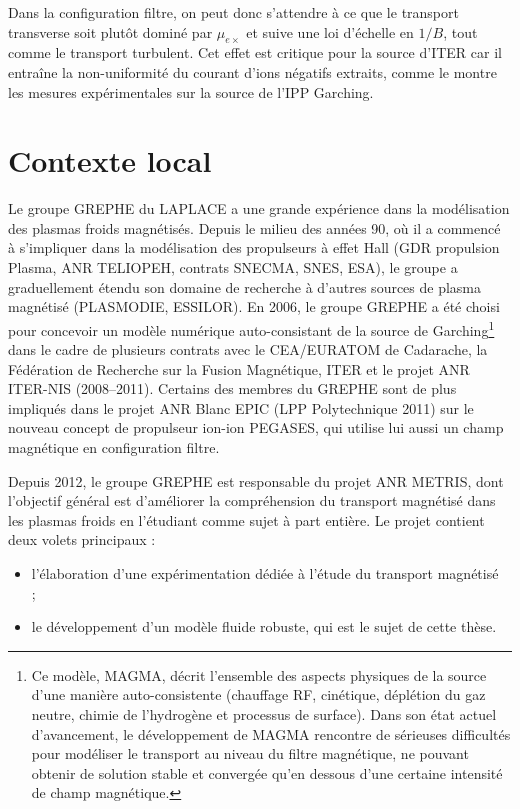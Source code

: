 \begin{refsection}
Dans la configuration filtre, on peut donc s'attendre à ce que le transport
transverse soit plutôt dominé par $\mu_{e\times}$ et suive une loi d'échelle en $1/B$, tout comme le transport
turbulent. Cet effet est critique pour la source d'ITER car il
entraîne la non-uniformité du courant d'ions négatifs extraits, comme le montre
les mesures expérimentales sur la source de l'IPP Garching.

 \section*{Contexte local} Le
groupe GREPHE du LAPLACE a une grande expérience dans la modélisation des plasmas froids magnétisés. Depuis le milieu des années 90, où il a commencé à s'impliquer dans la modélisation des propulseurs à effet Hall (GDR propulsion Plasma, ANR TELIOPEH, contrats SNECMA, SNES, ESA), le groupe a graduellement
étendu son domaine de recherche à d'autres sources de plasma magnétisé
(PLASMODIE, ESSILOR). En 2006, le groupe GREPHE
a été choisi pour concevoir un modèle numérique auto-consistant de la source de
Garching\footnote{Ce modèle, MAGMA, décrit l'ensemble des aspects
physiques de la source d'une manière auto-consistente (chauffage RF, cinétique,
déplétion du gaz neutre, chimie de l'hydrogène et processus de surface). Dans
son état actuel d'avancement, le développement de MAGMA rencontre de sérieuses
difficultés pour modéliser le transport au niveau du filtre magnétique, ne
pouvant obtenir de solution stable et convergée qu'en dessous d'une certaine
intensité de champ magnétique.} dans le cadre de plusieurs contrats avec le CEA/EURATOM de
Cadarache, la Fédération de Recherche sur la Fusion Magnétique, ITER et le
projet ANR ITER-NIS (2008--2011). Certains des membres du GREPHE sont de plus
impliqués dans le projet ANR Blanc EPIC (LPP Polytechnique 2011) sur le nouveau
concept de propulseur ion-ion PEGASES, qui utilise lui aussi un
champ magnétique en configuration filtre. 

Depuis 2012, le groupe GREPHE est responsable du projet ANR METRIS, dont
l'objectif général est d'améliorer la compréhension du transport magnétisé dans
les plasmas froids en l'étudiant comme sujet à part entière. Le projet
contient deux volets principaux :

\begin{itemize}
  \item l'élaboration d'une expérimentation dédiée à l'étude du transport
magnétisé~\parencite{Baude} ;
\item le développement d'un modèle fluide robuste, qui est
le sujet de cette thèse.
\end{itemize}
 

\end{refsection}
